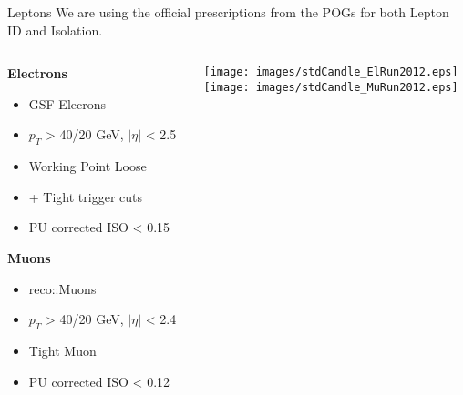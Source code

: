 \documentclass{beamer}
\begin{document}
\begin{frame}{Leptons}
  We are using the official prescriptions from the POGs for both Lepton ID and Isolation.
\begin{columns}
      \begin{column}{0.5\textwidth}
        \begin{center}
  {\bf Electrons}
  \begin{itemize}
    \footnotesize
  \item
    GSF Elecrons
  \item
    $p_{T}$ > 40/20 GeV, $|\eta|$ < 2.5
  \item
    Working Point Loose
  \item
    + Tight trigger cuts
  \item
    PU corrected ISO < 0.15
  \end{itemize}
  \vspace{3em}

  {\bf Muons}
  \begin{itemize}
    \footnotesize
  \item
    reco::Muons
  \item
    $p_{T}$ > 40/20 GeV, $|\eta|$ < 2.4
  \item
    Tight Muon
  \item
    PU corrected ISO < 0.12
  \end{itemize}
  \end{center}
\end{column}
      
      \begin{column}{0.5\textwidth}
        \texttt{[image: images/stdCandle\_ElRun2012.eps]}\\
         \texttt{[image: images/stdCandle\_MuRun2012.eps]}
\end{column}
\end{columns}
\end{frame}
\end{document}
